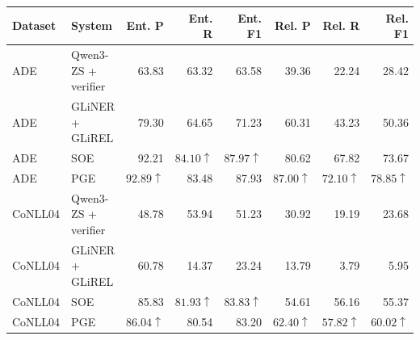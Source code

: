 \begin{tabular}{llrrrrrr}
\toprule
Dataset & System & Ent. P & Ent. R & Ent. F1 & Rel. P & Rel. R & Rel. F1 \\
\midrule
ADE & Qwen3-ZS + verifier & 63.83 & 63.32 & 63.58 & 39.36 & 22.24 & 28.42 \\
ADE & GLiNER + GLiREL & 79.30 & 64.65 & 71.23 & 60.31 & 43.23 & 50.36 \\
ADE & SOE & 92.21 & $\mathbf{84.10}\uparrow$ & $\mathbf{87.97}\uparrow$ & 80.62 & 67.82 & 73.67 \\
ADE & PGE & $\mathbf{92.89}\uparrow$ & 83.48 & 87.93 & $\mathbf{87.00}\uparrow$ & $\mathbf{72.10}\uparrow$ & $\mathbf{78.85}\uparrow$ \\
CoNLL04 & Qwen3-ZS + verifier & 48.78 & 53.94 & 51.23 & 30.92 & 19.19 & 23.68 \\
CoNLL04 & GLiNER + GLiREL & 60.78 & 14.37 & 23.24 & 13.79 & 3.79 & 5.95 \\
CoNLL04 & SOE & 85.83 & $\mathbf{81.93}\uparrow$ & $\mathbf{83.83}\uparrow$ & 54.61 & 56.16 & 55.37 \\
CoNLL04 & PGE & $\mathbf{86.04}\uparrow$ & 80.54 & 83.20 & $\mathbf{62.40}\uparrow$ & $\mathbf{57.82}\uparrow$ & $\mathbf{60.02}\uparrow$ \\
\bottomrule
\end{tabular}
